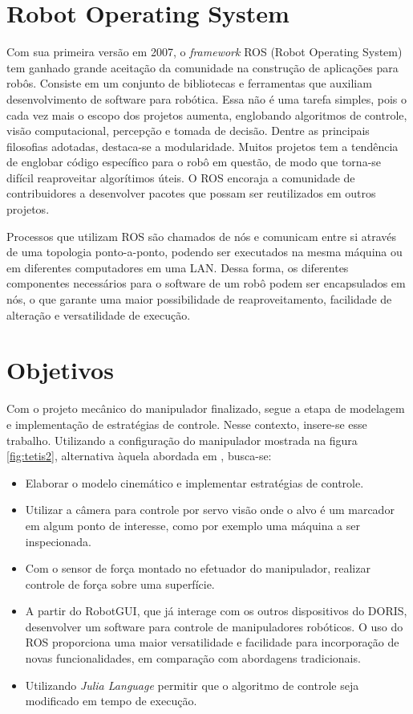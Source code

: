 \section{Robot Operating System}
Com sua primeira versão em 2007, o \textit{framework} ROS (Robot Operating System) tem ganhado grande aceitação da comunidade na construção de aplicações para robôs. Consiste em um conjunto de bibliotecas e ferramentas que auxiliam desenvolvimento de software para robótica. Essa não é uma tarefa simples, pois o cada vez mais o escopo dos projetos aumenta, englobando algoritmos de controle, visão computacional, percepção e tomada de decisão.
Dentre as principais filosofias adotadas, destaca-se a modularidade. 
Muitos projetos tem a tendência de englobar código específico para o robô em questão, de modo que torna-se difícil reaproveitar algorítimos úteis. O ROS encoraja a comunidade de contribuidores a desenvolver pacotes que possam ser reutilizados em outros projetos.  

Processos que utilizam ROS são chamados de nós e comunicam entre si através de uma topologia ponto-a-ponto, podendo ser executados na mesma máquina ou em diferentes computadores em uma LAN. Dessa forma, os diferentes componentes necessários para o software de um robô podem ser encapsulados em nós, o que garante uma maior possibilidade de reaproveitamento, facilidade de alteração e versatilidade de execução.


\section{Objetivos}

Com o projeto mecânico do manipulador finalizado, segue a etapa de modelagem e implementação de estratégias de controle. 
Nesse contexto, insere-se esse trabalho. Utilizando a configuração do manipulador mostrada na figura \ref{fig:tetis2}, alternativa àquela abordada em \citep{xaud2016doris},  busca-se:
\begin{itemize}
\item Elaborar o modelo cinemático e implementar estratégias de controle. %

\item Utilizar a câmera para controle por servo visão onde o alvo é um marcador em algum ponto de interesse, como por exemplo uma máquina a ser inspecionada. 

\item Com o sensor de força montado no efetuador do manipulador, realizar controle de força sobre uma superfície.

\item A partir do RobotGUI, que já interage com os outros dispositivos do DORIS, desenvolver um software para controle de manipuladores robóticos. O uso do ROS proporciona uma maior versatilidade e facilidade para incorporação de novas funcionalidades, em comparação com abordagens tradicionais.

\item Utilizando \textit{Julia Language} permitir que o algoritmo de controle seja modificado em tempo de execução.
\end{itemize}


